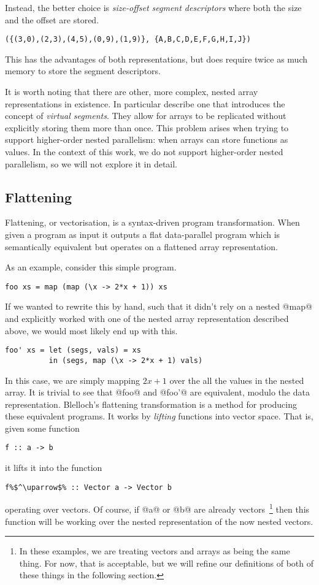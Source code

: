 Instead, the better choice is \emph{size-offset segment descriptors} where both the size and the offset are stored.
%
\begin{lstlisting}
({(3,0),(2,3),(4,5),(0,9),(1,9)}, {A,B,C,D,E,F,G,H,I,J})
\end{lstlisting}
%
This has the advantages of both representations, but does require twice as much memory to store the segment descriptors.


It is worth noting that there are other, more complex, nested array representations in existence. In particular \citet{Lippmeier:replicate} describe one that introduces the concept of \emph{virtual segments}. They allow for arrays to be replicated without explicitly storing them more than once. This problem arises when trying to support higher-order nested parallelism: when arrays can store functions as values. In the context of this work, we do not support higher-order nested parallelism, so we will not explore it in detail.

\subsection{Flattening}

Flattening, or vectorisation, is a syntax-driven program transformation. When given a program as input it outputs a flat data-parallel program which is semantically equivalent but operates on a flattened array representation.

As an example, consider this simple program.
%
\begin{lstlisting}
foo xs = map (map (\x -> 2*x + 1)) xs
\end{lstlisting}
%
If we wanted to rewrite this by hand, such that it didn't rely on a nested @map@ and explicitly worked with one of the nested array representation described above, we would most likely end up with this.
%
\begin{lstlisting}
foo' xs = let (segs, vals) = xs
          in (segs, map (\x -> 2*x + 1) vals)
\end{lstlisting}
%
In this case, we are simply mapping $2x+1$ over the all the values in the nested array. It is trivial to see that @foo@ and @foo'@ are equivalent, modulo the data representation. Blelloch's flattening transformation is a method for producing these equivalent programs. It works by \emph{lifting} functions into vector space. That is, given some function
%
\begin{lstlisting}
f :: a -> b
\end{lstlisting}
%
it lifts it into the function
%
\begin{lstlisting}
f%$^\uparrow$% :: Vector a -> Vector b
\end{lstlisting}
%
operating over vectors. Of course, if @a@ or @b@ are already vectors~\footnote{In these examples, we are treating vectors and arrays as being the same thing. For now, that is acceptable, but we will refine our definitions of both of these things in the following section.} then this function will be working over the nested representation of the now nested vectors.

